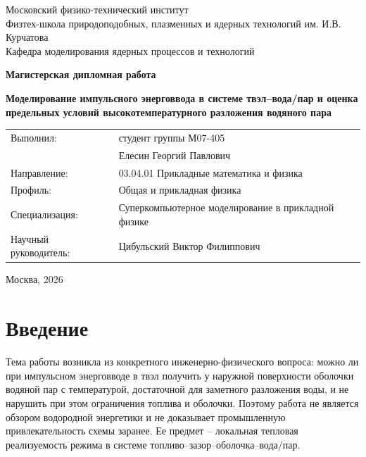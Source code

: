 \documentclass[12pt]{article}
\begin{document}
\begin{titlepage}
    \centering
    {\large Московский физико-технический институт\\[0.3cm]
    Физтех-школа природоподобных, плазменных и ядерных технологий им. И.В. Курчатова\\[0.3cm]
    Кафедра моделирования ядерных процессов и технологий\par}

    \vspace{2.5cm}

    {\Large\bfseries Магистерская дипломная работа\par}

    \vspace{1.5cm}

    {\LARGE\bfseries Моделирование импульсного энерговвода в системе твэл--вода/пар и оценка предельных условий высокотемпературного разложения водяного пара\par}

    \vspace{2.5cm}

    \begin{flushright}
        \begin{tabular}{>{\raggedleft\arraybackslash}p{5cm}p{7cm}}
            Выполнил: & студент группы М07-405\\
            & Елесин Георгий Павлович\\[0.4cm]
            Направление: & 03.04.01 Прикладные математика и физика\\[0.4cm]
            Профиль: & Общая и прикладная физика\\[0.4cm]
            Специализация: & Суперкомпьютерное моделирование в прикладной физике\\[0.4cm]
            Научный руководитель: & Цибульский Виктор Филиппович\\
        \end{tabular}
    \end{flushright}

    \vfill

    {Москва, 2026}
\end{titlepage}

\tableofcontents
\newpage

\section{Введение}

Тема работы возникла из конкретного инженерно-физического вопроса: можно ли при импульсном энерговводе в твэл получить у наружной поверхности оболочки водяной пар с температурой, достаточной для заметного разложения воды, и не нарушить при этом ограничения топлива и оболочки. Поэтому работа не является обзором водородной энергетики и не доказывает промышленную привлекательность схемы заранее. Ее предмет -- локальная тепловая реализуемость режима в системе топливо--зазор--оболочка--вода/пар.
\end{document}
